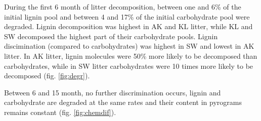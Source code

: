 \documentclass[10pt]{article}
\begin{document}
%
%
%
%
During the first 6 month of litter decomposition, between one and 6\% of the initial lignin pool and between 4 and 17\% of the initial carbohydrate pool were degraded. Lignin decomposition was highest in AK and KL litter, while KL and SW decomposed the highest part of their carbohydrate pools. Lignin discimination (compared to carbohydrates) was highest in SW and lowest in AK litter. In AK litter, lignin molecules were 50\% more likely to be decomposed than carbohydrates, while in SW litter carbohydrates were 10 times more likely to be decomposed (fig. \ref{fig:degr}).

Between 6 and 15 month, no further discrimination occurs, lignin and carbohydrate are degraded at the same rates and their content in pyrograms remains constant (fig. \ref{fig:chemdif}).
\end{document}
